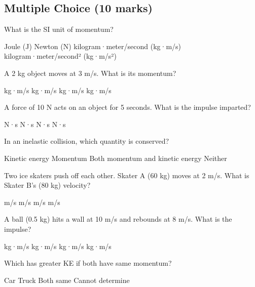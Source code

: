 \documentclass[addpoints]{exam}
\begin{document}
\newpage
\begin{questions}

\begin{questions}

\section*{Multiple Choice (10 marks)}
\vspace{5mm}

\question[1] What is the SI unit of momentum?
\begin{choices}
    \choice Joule (J)
    \choice Newton (N)
    \correctchoice kilogram·meter/second (kg·m/s)
    \choice kilogram·meter/second² (kg·m/s²)
\end{choices}

\question[1] A 2 kg object moves at 3 m/s. What is its momentum?
\begin{choices}
     kg·m/s
     kg·m/s
     kg·m/s
     kg·m/s
\end{choices}

\question[1] A force of 10 N acts on an object for 5 seconds. What is the impulse imparted?
\begin{choices}
     N·s
     N·s
     N·s
     N·s
\end{choices}

\question[1] In an inelastic collision, which quantity is conserved?
\begin{choices}
    \choice Kinetic energy
    \correctchoice Momentum
    \choice Both momentum and kinetic energy
    \choice Neither
\end{choices}

\question[1] Two ice skaters push off each other. Skater A (60 kg) moves at 2 m/s. What is Skater B's (80 kg) velocity?
\begin{choices}
     m/s
     m/s
     m/s
     m/s
\end{choices}

\question[1] A ball (0.5 kg) hits a wall at 10 m/s and rebounds at 8 m/s. What is the impulse?
\begin{choices}
     kg·m/s
     kg·m/s
     kg·m/s
     kg·m/s
\end{choices}

\question[1] Which has greater KE if both have same momentum?
\begin{choices}
    \correctchoice Car
    \choice Truck
    \choice Both same
    \choice Cannot determine
\end{choices}


\end{questions}
\end{questions}
\end{document}
